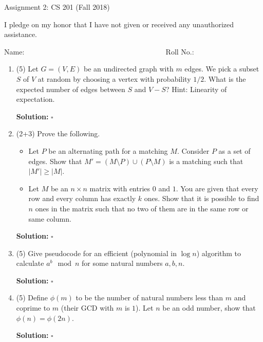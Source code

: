 \documentclass[10pt]{letter}
\newcommand{\abs}[1]{{\left\lvert #1 \right\rvert}}
\newenvironment{solution}{\textbf{Solution:}}{\hfill$\square$}
\begin{document}
\begin{center}
Assignment 2: CS 201 (Fall 2018)
\end{center}

I pledge on my honor that I have not given or received any unauthorized assistance.

Name:        ~~~~~~~~~~~~~~~~~~~~~~~~~~~~~~~~~~~~~~   Roll No.:       \\



\begin{enumerate}

\item (5) Let $G=(V,E)$ be an undirected graph with $m$ edges. We pick a subset $S$ of  
$V$ at random by choosing a vertex with probability $1/2$. What is the expected  
number of edges between $S$ and $V-S$?
Hint: Linearity of expectation.

\begin{solution}
\end{solution}

\item (2+3) Prove the following.
\begin{itemize}
\item Let $P$ be an alternating path for a matching $M$. Consider $P$ as a set of edges.
Show that $M' = (M\setminus P) \cup (P \setminus M)$ is a matching such that $\abs{M'} \geq \abs{M}$.
\item Let $M$ be an $n\times n$ matrix with entries $0$ and $1$. You are given that every row and every column has exactly $k$ ones. 
Show that it is possible to find $n$ ones in the matrix such that no two of them are in the same row or same column.  
\end{itemize}  


\begin{solution}
\end{solution}


\item (5) Give pseudocode for an efficient (polynomial in $\log{n}$) algorithm to calculate $a^b \mod n$ for some natural numbers $a,b,n$. 

\begin{solution}
\end{solution}


\item (5) Define $\phi(m)$ to be the number of natural numbers less than $m$ and coprime to $m$ (their GCD with $m$ is $1$).
Let $n$ be an odd number, show that $\phi(n) = \phi(2n)$. 
 
\begin{solution}
\end{solution}


\end{enumerate}
\end{document}
